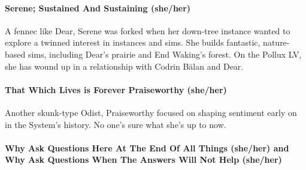 \paragraph{Serene; Sustained And Sustaining (she/her)}

A fennec like Dear, Serene was forked when her down-tree instance wanted to explore a twinned interest in instances and sims. She builds fantastic, nature-based sims, including Dear's prairie and End Waking's forest. On the Pollux LV, she has wound up in a relationship with Codrin Bălan and Dear.

\begin{comment}
\emph{Appears in:}

\begin{itemize}
\tightlist
\item
  \href{https://qoheleth.post-self.ink}{\emph{Qoheleth}}
\item
  \href{https://toledot.post-self.ink}{\emph{Toledot}}
\item
  \href{https://neviim.post-self.ink}{\emph{Nevi'im}} (mentioned)
\item
  \href{https://mitzvot.post-self.ink}{\emph{Mitzvot}}
\item
  ``Selected Letters'' (mentioned)
\end{itemize}
\end{comment}

\paragraph{That Which Lives is Forever Praiseworthy (she/her)}

Another skunk-type Odist, Praiseworthy focused on shaping sentiment early on in the System's history. No one's sure what she's up to now.

\begin{comment}
\emph{Appears in:}

\begin{itemize}
\tightlist
\item
  \href{https://qoheleth.post-self.ink}{\emph{Qoheleth}}
\item
  \href{https://toledot.post-self.ink}{\emph{Toledot}} (mentioned)
\item
  \href{https://mitzvot.post-self.ink}{\emph{Mitzvot}} (mentioned)
\end{itemize}
\end{comment}

\paragraph{Why Ask Questions Here At The End Of All Things (she/her) and Why Ask Questions When The Answers Will Not Help (she/her)}

